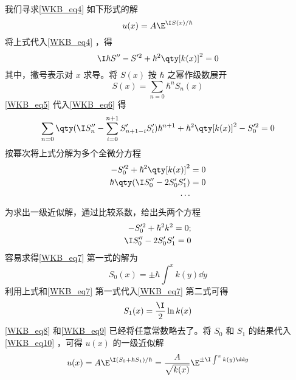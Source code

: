 我们寻求\autoref{WKB_eq4} 如下形式的解
\begin{equation}\label{WKB_eq10}
u(x)=A\E^{\I S(x)/\hbar}
\end{equation}
将上式代入\autoref{WKB_eq4} ，得
\begin{equation}\label{WKB_eq6}
\I\hbar S''-S'^2+\hbar^2\qty[k(x)]^2=0
\end{equation}
其中，撇号表示对 $x$ 求导。将 $S(x)$ 按 $\hbar$ 之幂作级数展开
\begin{equation}\label{WKB_eq5}
S(x)=\sum_{n=0}\hbar^nS_n(x)
\end{equation}
\autoref{WKB_eq5} 代入\autoref{WKB_eq6} 得
\begin{equation}
\sum_{n=0}\qty(\I S_n''-\sum_{i=0}^{n+1}S_{n+1-i}'S_i')\hbar^{n+1}+\hbar^2\qty[k(x)]^2-S_0'^2=0
\end{equation}
按幂次将上式分解为多个全微分方程
\begin{equation}
\begin{aligned}
-S_0'^2+\hbar^2\qty[k(x)]^2&=0\\
\hbar\qty(\I S_0''-2S_0'S_1')&=0\\
\cdots
\end{aligned}
\end{equation}
为求出一级近似解，通过比较系数，给出头两个方程
\begin{equation}\label{WKB_eq7}
\begin{aligned}
-S_0'^2+\hbar^2k^2=0;\\
\I S_0''-2S_0'S_1'=0
\end{aligned}
\end{equation}
容易求得\autoref{WKB_eq7} 第一式的解为
\begin{equation}\label{WKB_eq8}
S_0(x)=\pm\hbar\int^x k(y)\dd y
\end{equation}
利用上式和\autoref{WKB_eq7} 第一式代入\autoref{WKB_eq7} 第二式可得
\begin{equation}\label{WKB_eq9}
S_1(x)=\frac{\I}{2}\ln k(x)
\end{equation}
\autoref{WKB_eq8} 和\autoref{WKB_eq9} 已经将任意常数略去了。将 $S_0$ 和 $S_1$ 的结果代入\autoref{WKB_eq10} ，可得 $u(x)$ 的一级近似解
\begin{equation}\label{WKB_eq11}
u(x)=A\E^{\I(S_0+\hbar S_1)/\hbar}=\frac{A}{\sqrt{k(x)}} \E^{\pm\I\int^x k(y)\dd y}
\end{equation}
